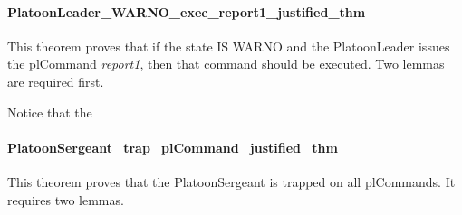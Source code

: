 \documentclass[../../main/main.tex]{subfiles}
\begin{document}
\paragraph*{PlatoonLeader_WARNO_exec_report1_justified_thm}
This theorem proves that if the state IS WARNO and the PlatoonLeader issues the plCommand \textit{report1}, then that command should be executed.  Two lemmas are required first.  

Notice that the 

\HOLssmPlanPBTheoremsPlatoonLeaderXXWARNOXXexecXXreportOneXXlemma

\HOLssmPlanPBTheoremsPlatoonLeaderXXWARNOXXexecXXreportOneXXjustifiedXXlemma

\HOLssmPlanPBTheoremsPlatoonLeaderXXWARNOXXexecXXreportOneXXjustifiedXXthm


\paragraph*{PlatoonSergeant_trap_plCommand_justified_thm}
This theorem proves that the PlatoonSergeant is trapped on all plCommands.  It requires two lemmas.

\HOLssmPlanPBTheoremsPlatoonSergeantXXtrapXXplCommandXXlemma

\HOLssmPlanPBTheoremsPlatoonSergeantXXtrapXXplCommandXXjustifiedXXlemma

\HOLssmPlanPBTheoremsPlatoonSergeantXXtrapXXplCommandXXjustifiedXXthm
\end{document}
